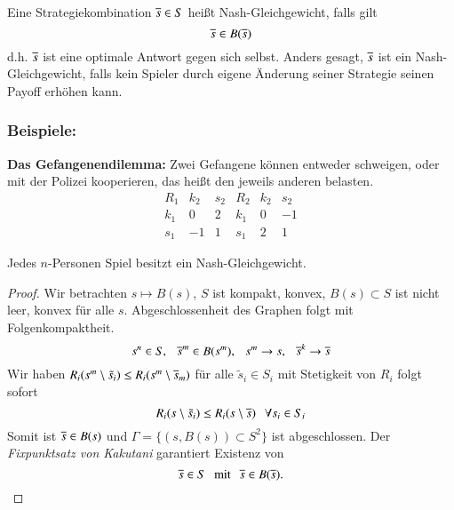 \begin{defi}
    Eine Strategiekombination $\overline s\in S$ heißt Nash-Gleichgewicht, falls gilt
    \[
        \overline s \in B(\overline s)
    \]
    d.h. $\overline s$ ist eine optimale Antwort gegen sich selbst. Anders gesagt, $\overline s$ ist ein 
    Nash-Gleichgewicht, falls kein Spieler durch eigene Änderung seiner Strategie seinen Payoff erhöhen
    kann.
\end{defi}

\subsubsection*{Beispiele:}

    \textbf{Das Gefangenendilemma:}
    Zwei Gefangene können entweder schweigen, oder mit der Polizei kooperieren, das heißt den jeweils
    anderen belasten.
    \[
        \begin{array}{c|cc||c|cc} R_1& k_2& s_2& R_2&k_2&s_2\\ \hline k_1&0&2&k_1&0&-1\\
            s_1&-1&1&s_1&2&1\end{array}
    \]
\begin{theorem}\label{2.18}
    Jedes $n$-Personen Spiel besitzt ein Nash-Gleichgewicht.
\end{theorem}

\begin{proof}
    Wir betrachten $s\mapsto B(s)$, $S$ ist kompakt, konvex, $B(s)\subset S$ ist nicht leer, konvex für
    alle $s$. Abgeschlossenheit des Graphen folgt mit Folgenkompaktheit.
    \[
        s^n\in S, \hspace{.25cm} \overline s^m\in B(s^m), \hspace{.25cm} s^m\rightarrow s, \hspace{.25cm} \overline s^k\rightarrow \overline s
    \]
    Wir haben $R_i(s^m\setminus \tilde s_i)\leq R_i(s^m\setminus \overline s_m)$ für alle $\tilde s_i \in S_i$
    mit Stetigkeit von $R_i$ folgt sofort
    \[
        R_i(s\setminus \tilde s_i) \leq R_i(s\setminus \overline s) \hspace{.25cm} \forall s_i\in S_i
    \]
    Somit ist $\overline s \in B(s)$ und $\Gamma= \{ (s,B(s))\subset S^2 \}$ ist abgeschlossen.
    Der \textit{Fixpunktsatz von Kakutani} garantiert Existenz von
    \[
        \overline s\in S \hspace{.25cm} \text{mit} \hspace{.25cm} \overline s \in B(\overline s).
    \]
\end{proof}
